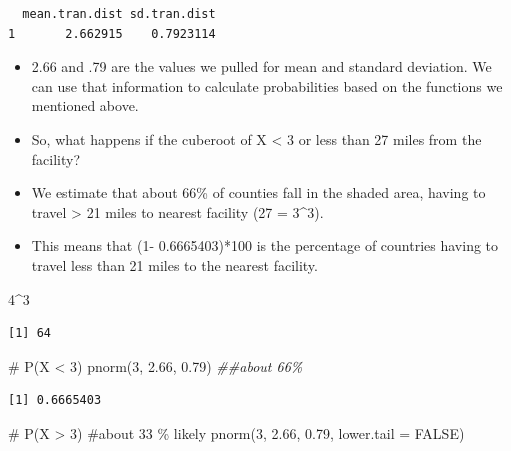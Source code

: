 \documentclass[
  letterpaper,
  DIV=11,
  numbers=noendperiod]{scrreprt}
\newenvironment{Shaded}{\begin{snugshade}}{\end{snugshade}}
\newcommand{\AttributeTok}[1]{\textcolor[rgb]{0.40,0.45,0.13}{#1}}
\newcommand{\CommentTok}[1]{\textcolor[rgb]{0.37,0.37,0.37}{#1}}
\newcommand{\ConstantTok}[1]{\textcolor[rgb]{0.56,0.35,0.01}{#1}}
\newcommand{\DecValTok}[1]{\textcolor[rgb]{0.68,0.00,0.00}{#1}}
\newcommand{\DocumentationTok}[1]{\textcolor[rgb]{0.37,0.37,0.37}{\textit{#1}}}
\newcommand{\FloatTok}[1]{\textcolor[rgb]{0.68,0.00,0.00}{#1}}
\newcommand{\FunctionTok}[1]{\textcolor[rgb]{0.28,0.35,0.67}{#1}}
\newcommand{\NormalTok}[1]{\textcolor[rgb]{0.00,0.23,0.31}{#1}}
\newcommand{\SpecialCharTok}[1]{\textcolor[rgb]{0.37,0.37,0.37}{#1}}
\providecommand{\tightlist}{%
  \setlength{\itemsep}{0pt}\setlength{\parskip}{0pt}}\usepackage{longtable,booktabs,array}
\begin{document}
\begin{verbatim}
  mean.tran.dist sd.tran.dist
1       2.662915    0.7923114
\end{verbatim}

\begin{itemize}
\tightlist
\item
  2.66 and .79 are the values we pulled for mean and standard deviation.
  We can use that information to calculate probabilities based on the
  functions we mentioned above.
\item
  So, what happens if the cuberoot of X \textless{} 3 or less than 27
  miles from the facility?
\item
  We estimate that about 66\% of counties fall in the shaded area,
  having to travel \textgreater{} 21 miles to nearest facility (27 =
  3\^{}3).
\item
  This means that (1- 0.6665403)*100 is the percentage of countries
  having to travel less than 21 miles to the nearest facility.
\end{itemize}

\begin{Shaded}
\begin{Highlighting}[]
\DecValTok{4}\SpecialCharTok{\^{}}\DecValTok{3}
\end{Highlighting}
\end{Shaded}

\begin{verbatim}
[1] 64
\end{verbatim}

\begin{Shaded}
\begin{Highlighting}[]
\CommentTok{\# P(X \textless{} 3)}
\FunctionTok{pnorm}\NormalTok{(}\DecValTok{3}\NormalTok{, }\FloatTok{2.66}\NormalTok{, }\FloatTok{0.79}\NormalTok{)  }\DocumentationTok{\#\#about 66\%}
\end{Highlighting}
\end{Shaded}

\begin{verbatim}
[1] 0.6665403
\end{verbatim}

\begin{Shaded}
\begin{Highlighting}[]
\CommentTok{\# P(X \textgreater{} 3) \#about 33 \% likely}
\FunctionTok{pnorm}\NormalTok{(}\DecValTok{3}\NormalTok{, }\FloatTok{2.66}\NormalTok{, }\FloatTok{0.79}\NormalTok{, }\AttributeTok{lower.tail =} \ConstantTok{FALSE}\NormalTok{)}
\end{Highlighting}
\end{Shaded}
\end{document}
